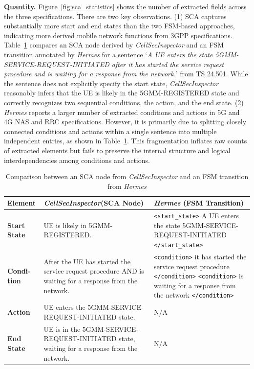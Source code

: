 \documentclass[sigconf]{acmart}
\newcommand{\lm}{\textit{CellSecInspector}\xspace}
\begin{document}
{\noindent \textbf{Quantity.} Figure~\ref{fig:sca_statistics} shows the number of extracted fields across the three specifications. There are two key observations. (1) SCA captures substantially more start and end states than the two FSM-based approaches, indicating more derived mobile network functions from 3GPP specifications. Table~\ref{tab:sca_vs_hermes} compares an SCA node derived by \lm and an FSM transition annotated by \textit{Hermes} for a sentence `\textit{A UE enters the state 5GMM-SERVICE-REQUEST-INITIATED after it has started the service request procedure and is waiting for a response from the network.}' from TS 24.501. While the sentence does not explicitly specify the start state, \lm reasonably infers that the UE is likely in the 5GMM-REGISTERED state and correctly recognizes two sequential conditions, the action, and the end state. (2) \textit{Hermes} reports a larger number of extracted conditions and actions in 5G and 4G NAS and RRC specifications. However, it is primarily due to splitting closely connected conditions and actions within a single sentence into multiple independent entries, as shown in Table~\ref{tab:sca_vs_hermes}. This fragmentation inflates raw counts of extracted elements but fails to preserve the internal structure and logical interdependencies among conditions and actions. 


\begin{table}[t]
\centering
\caption{Comparison between an SCA node from \lm and an FSM transition from \textit{Hermes}}
\vspace{-0.1in}
\label{tab:sca_vs_hermes}
\scriptsize
\setlength{\tabcolsep}{2.8pt}
\begin{tabular}{p{0.9cm} | p{3.1cm} | p{3.9cm}}
\toprule
\textbf{Element} & \textbf{\lm (SCA Node)} & \textbf{\textit{Hermes} (FSM Transition)} \\
\midrule
\textbf{Start State} &
UE is likely in 5GMM-REGISTERED. &
\texttt{<start\_state>} A UE enters the state 5GMM-SERVICE-REQUEST-INITIATED \texttt{</start\_state>} \\
\midrule
\textbf{Condi- tion} &
After the UE has started the service request procedure AND is waiting for a response from the network. &
\texttt{<condition>} it has started the service request procedure \texttt{</condition>} \newline
\texttt{<condition>} is waiting for a response from the network \texttt{</condition>} \\
\midrule
\textbf{Action} &
UE enters the 5GMM-SERVICE-REQUEST-INITIATED state. &
N/A \\
\midrule
\textbf{End State} &
UE is in the 5GMM-SERVICE-REQUEST-INITIATED state, waiting for a response from the network. &
N/A \\
\bottomrule
\end{tabular}
\end{table}


}
\end{document}
